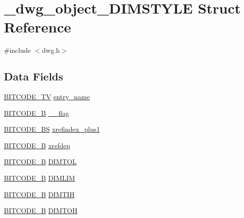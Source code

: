 \hypertarget{struct__dwg__object__DIMSTYLE}{\section{\-\_\-dwg\-\_\-object\-\_\-\-D\-I\-M\-S\-T\-Y\-L\-E \-Struct \-Reference}
\label{struct__dwg__object__DIMSTYLE}
}


{\ttfamily \#include $<$dwg.\-h$>$}

\subsection*{\-Data \-Fields}
\begin{DoxyCompactItemize}
\item 
\hyperlink{dwg_8h_a2a7e040c6e36ca039b03608679ecaf7c}{\-B\-I\-T\-C\-O\-D\-E\-\_\-\-T\-V} \hyperlink{struct__dwg__object__DIMSTYLE_a14d27d904820f3d354314398a617090e}{entry\-\_\-name}
\item 
\hyperlink{dwg_8h_ab533b1f62d9086749e3bb5b67e9f224e}{\-B\-I\-T\-C\-O\-D\-E\-\_\-\-B} \hyperlink{struct__dwg__object__DIMSTYLE_af0e001328ddbd3def14a0c5946b7ec32}{\-\_\-\_\-flag}
\item 
\hyperlink{dwg_8h_a94297606fbd4a4ff97e8add284af0809}{\-B\-I\-T\-C\-O\-D\-E\-\_\-\-B\-S} \hyperlink{struct__dwg__object__DIMSTYLE_a37a10268902d08080b2485bc53a77230}{xrefindex\-\_\-plus1}
\item 
\hyperlink{dwg_8h_ab533b1f62d9086749e3bb5b67e9f224e}{\-B\-I\-T\-C\-O\-D\-E\-\_\-\-B} \hyperlink{struct__dwg__object__DIMSTYLE_a2970e1825f2da51af2ab7e3c39b2c044}{xrefdep}
\item 
\hyperlink{dwg_8h_ab533b1f62d9086749e3bb5b67e9f224e}{\-B\-I\-T\-C\-O\-D\-E\-\_\-\-B} \hyperlink{struct__dwg__object__DIMSTYLE_afd85f21d4de09fe6ca29381d9dd6000a}{\-D\-I\-M\-T\-O\-L}
\item 
\hyperlink{dwg_8h_ab533b1f62d9086749e3bb5b67e9f224e}{\-B\-I\-T\-C\-O\-D\-E\-\_\-\-B} \hyperlink{struct__dwg__object__DIMSTYLE_acfc8d4b81213b987db01e2fc25e146aa}{\-D\-I\-M\-L\-I\-M}
\item 
\hyperlink{dwg_8h_ab533b1f62d9086749e3bb5b67e9f224e}{\-B\-I\-T\-C\-O\-D\-E\-\_\-\-B} \hyperlink{struct__dwg__object__DIMSTYLE_aaa707c477c319ad1cdd656cb4e581e17}{\-D\-I\-M\-T\-I\-H}
\item 
\hyperlink{dwg_8h_ab533b1f62d9086749e3bb5b67e9f224e}{\-B\-I\-T\-C\-O\-D\-E\-\_\-\-B} \hyperlink{struct__dwg__object__DIMSTYLE_a0c1c101a3dcb1294200580ae8b8b2113}{\-D\-I\-M\-T\-O\-H}

\end{DoxyCompactItemize}
